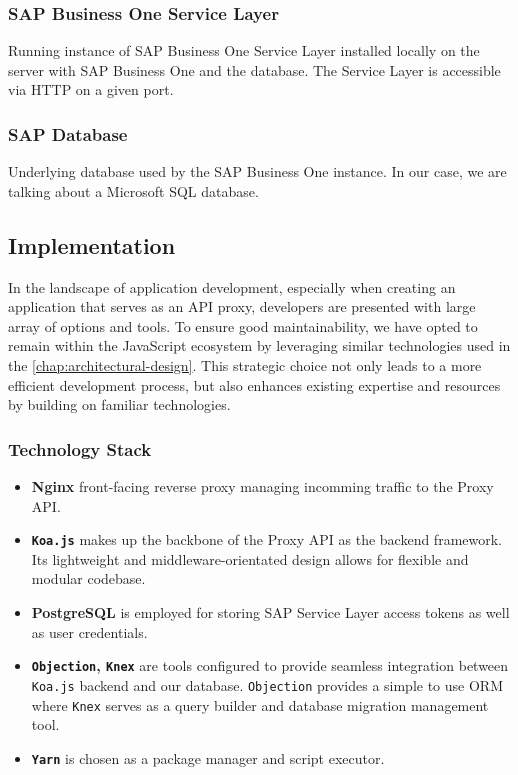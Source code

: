 \subsubsection{SAP Business One Service Layer}
Running instance of SAP Business One Service Layer installed locally on the server with SAP Business One and the database. 
The Service Layer is accessible via HTTP on a given port.

\subsubsection{SAP Database}
Underlying database used by the SAP Business One instance.
In our case, we are talking about a Microsoft SQL database.


\subsection{Implementation}
\label{subsec:implementation}
In the landscape of application development, especially when creating an application that serves as an API proxy, developers are presented with large array of options and tools.
To ensure good maintainability, we have opted to remain within the JavaScript ecosystem by leveraging similar technologies used in the \ref{chap:architectural-design}.
This strategic choice not only leads to a more efficient development process, but also enhances existing expertise and resources by building on familiar technologies.

\subsubsection{Technology Stack}

\begin{itemize}
    \item \textbf{Nginx} front-facing reverse proxy managing incomming traffic to the Proxy API.
    \item \textbf{\texttt{Koa.js}} makes up the backbone of the Proxy API as the backend framework. Its lightweight and middleware-orientated design allows for flexible and modular codebase. 
    \item \textbf{PostgreSQL} is employed for storing SAP Service Layer access tokens as well as user credentials.
    \item \textbf{\texttt{Objection}, \texttt{Knex}} are tools configured to provide seamless integration between \texttt{Koa.js} backend and our database. \texttt{Objection} provides a simple to use ORM where \texttt{Knex} serves as a query builder and database migration management tool.
    \item \textbf{\texttt{Yarn}} is chosen as a package manager and script executor.
\end{itemize}


